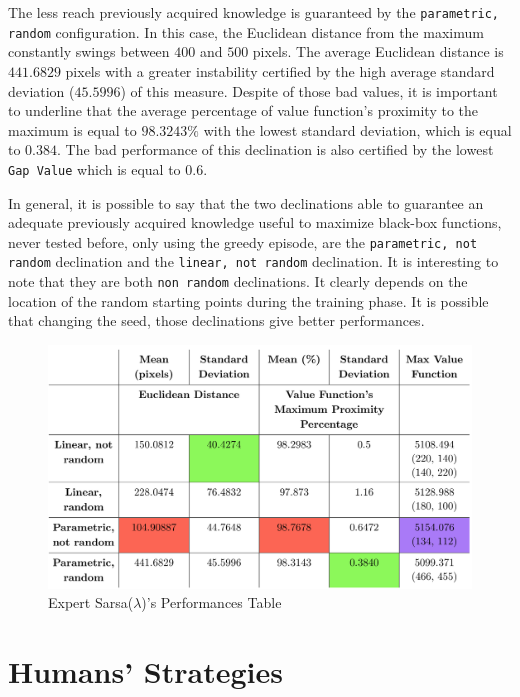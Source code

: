The less reach previously acquired knowledge is guaranteed by the {\tt parametric, random} configuration. In this case, the Euclidean distance from the maximum constantly swings between $400$ and $500$ pixels. The average Euclidean distance is $441.6829$ pixels with a greater instability certified by the high average standard deviation ($45.5996$) of this measure. Despite of those bad values, it is important to underline that the average percentage of value function's proximity to the maximum is equal to $98.3243\%$ with the lowest standard deviation, which is equal to $0.384$. The bad performance of this declination is also certified by the lowest {\tt Gap Value} which is equal to $0.6$.

In general, it is possible to say that the two declinations able to guarantee an adequate previously acquired knowledge useful to maximize black-box functions, never tested before, only using the greedy episode, are the {\tt parametric, not random} declination and the {\tt linear, not random} declination. It is interesting to note that they are both {\tt non random} declinations. It clearly depends on the location of the random starting points during the training phase. It is possible that changing the seed, those declinations give better performances.

\begin{figure}
	\centering
	\includegraphics[width=\linewidth]{IMAGES/ExpertReasumingTable}
	\caption{Expert Sarsa($\lambda$)'s Performances Table}
	\label{fig:expertreasumingtable}
\end{figure}

\section{Humans' Strategies}

